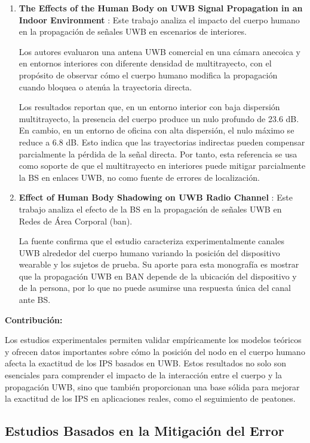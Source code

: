 \begin{enumerate}
    \item \textbf{The Effects of the Human Body on UWB Signal Propagation in an Indoor Environment} \cite{ref15}: Este trabajo analiza el impacto del cuerpo humano en la propagación de señales UWB en escenarios de interiores. 
    
    Los autores evaluaron una antena UWB comercial en una cámara anecoica y en entornos interiores con diferente densidad de multitrayecto, con el propósito de observar cómo el cuerpo humano modifica la propagación cuando bloquea o atenúa la trayectoria directa.

    Los resultados reportan que, en un entorno interior con baja dispersión multitrayecto, la presencia del cuerpo produce un nulo profundo de 23.6 dB. En cambio, en un entorno de oficina con alta dispersión, el nulo máximo se reduce a 6.8 dB. Esto indica que las trayectorias indirectas pueden compensar parcialmente la pérdida de la señal directa. Por tanto, esta referencia se usa como soporte de que el multitrayecto en interiores puede mitigar parcialmente la BS en enlaces UWB, no como fuente de errores de localización.

    \item \textbf{Effect of Human Body Shadowing on UWB Radio Channel} \cite{SasakiEffectHumanBody}: Este trabajo analiza el efecto de la BS en la propagación de señales UWB en Redes de Área Corporal (\gls{ban}). 
    
    La fuente confirma que el estudio caracteriza experimentalmente canales UWB alrededor del cuerpo humano variando la posición del dispositivo wearable y los sujetos de prueba. Su aporte para esta monografía es mostrar que la propagación UWB en BAN depende de la ubicación del dispositivo y de la persona, por lo que no puede asumirse una respuesta única del canal ante BS.
\end{enumerate}

\textbf{Contribución:}

Los estudios experimentales permiten validar empíricamente los modelos teóricos y ofrecen datos importantes sobre cómo la posición del nodo en el cuerpo humano afecta la exactitud de los IPS basados en UWB. Estos resultados no solo son esenciales para comprender el impacto de la interacción entre el cuerpo y la propagación UWB, sino que también proporcionan una base sólida para mejorar la exactitud de los IPS en aplicaciones reales, como el seguimiento de peatones.

\subsection{Estudios Basados en la Mitigación del Error}

